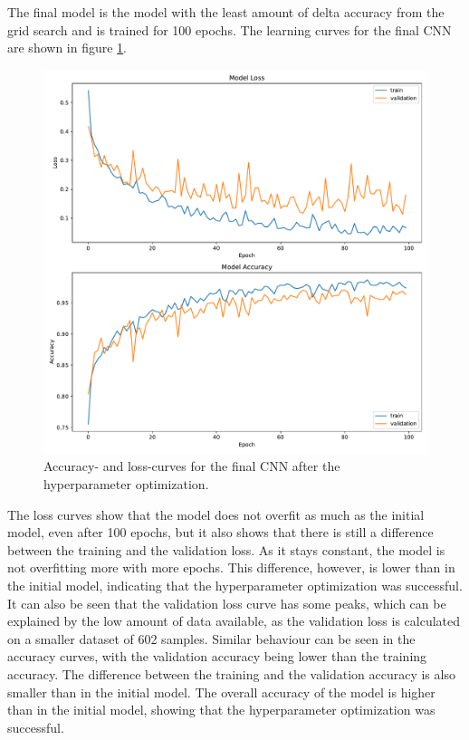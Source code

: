 The final model is the model with the least amount of delta accuracy from the grid search and is trained for 100 epochs. %
The learning curves for the final CNN are shown in figure \ref{fig:learningCurveFinal}.
\begin{figure}[H]
    \centering
    \includegraphics[width=.65\textwidth]{plots/history.pdf}
    \caption{Accuracy- and loss-curves for the final CNN after the hyperparameter optimization.}
    \label{fig:learningCurveFinal}
\end{figure}
The loss curves show that the model does not overfit as much as the initial model, even after 100 epochs, but it also shows that there is still a difference between the training and the validation loss.
As it stays constant, the model is not overfitting more with more epochs. 
This difference, however, is lower than in the initial model, indicating that the hyperparameter optimization was successful.
It can also be seen that the validation loss curve has some peaks, which can be explained by the low amount of data available, as the validation loss is calculated on a smaller dataset of 602 samples.
Similar behaviour can be seen in the accuracy curves, with the validation accuracy being lower than the training accuracy.
The difference between the training and the validation accuracy is also smaller than in the initial model.
The overall accuracy of the model is higher than in the initial model, showing that the hyperparameter optimization was successful.

